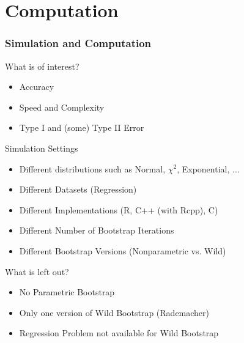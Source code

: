 \documentclass[9pt, dvipsnames]{beamer} %
\begin{document}
    \section{Computation}
    \begin{frame}
    	\frametitle{\textbf{Simulation and Computation}}
    	\begin{exampleblock}{What is of interest?}
    		\begin{itemize}
    			\item Accuracy
    			\item Speed and Complexity
    			\item Type I and (some) Type II Error
    		\end{itemize}
    	\end{exampleblock}
    	\begin{block}{Simulation Settings}
    		\begin{itemize}
    			\item Different distributions such as Normal, $\chi^2$, Exponential, ...
    			\item Different Datasets (Regression)
    			\item Different Implementations (R, C++ (with Rcpp), C) 
    			\item Different Number of Bootstrap Iterations
    			\item Different Bootstrap Versions (Nonparametric vs. Wild)
    		\end{itemize}
    	\end{block}
    	\begin{alertblock}{What is left out?}
    		\begin{itemize}
    			\item No Parametric Bootstrap
    			\item Only one version of Wild Bootstrap (Rademacher)
    			\item Regression Problem not available for Wild Bootstrap
    		\end{itemize}
    	\end{alertblock}
    \end{frame}
\end{document}
